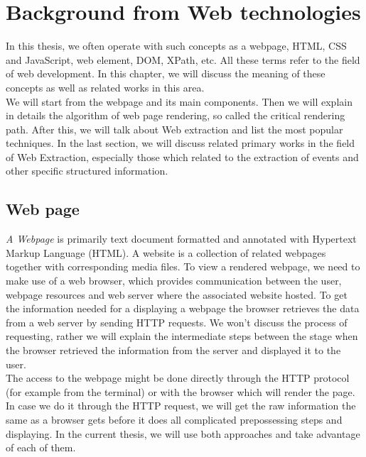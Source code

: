 \chapter{Background from Web technologies}
\label{chap:background}

In this thesis, we often operate with such concepts as a webpage, HTML, CSS and JavaScript, web element, DOM, XPath, etc. All these terms refer to the field of web development. In this chapter, we will discuss the meaning of these concepts as well as related works in this area.\\

We will start from the webpage and its main components. Then we will explain in details the algorithm of web page rendering, so called the critical rendering path. After this, we will talk about Web extraction and list the most popular techniques. In the last section, we will discuss related primary works in the field of Web Extraction, especially those which related to the extraction of events and other specific structured information.\\

\section{Web page}
\textit{A Webpage} is primarily text document formatted and annotated with Hypertext Markup Language (HTML). A website is a collection of related webpages together with corresponding media files. To view a rendered webpage, we need to make use of a web browser, which provides communication between the user, webpage resources and web server where the associated website hosted. To get the information needed for a displaying a webpage the browser retrieves the data from a web server by sending HTTP requests. We won't discuss the process of requesting, rather we will explain the intermediate steps between the stage when the browser retrieved the information from the server and displayed it to the user.\\ 

The access to the webpage might be done directly through the HTTP protocol (for example from the terminal) or with the browser which will render the page. In case we do it through the HTTP request, we will get the raw information the same as a browser gets before it does all complicated prepossessing steps and displaying. In the current thesis, we will use both approaches and take advantage of each of them.

